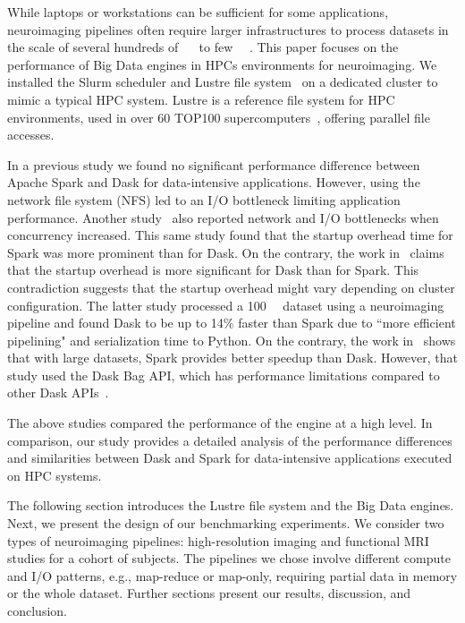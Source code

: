 \documentclass[AMA,STIX1COL]{WileyNJD-v2}
\newcommand{\HL}[1]{#1}
\begin{document}
While laptops or workstations can be sufficient for some applications, 
neuroimaging pipelines often require large\HL{r} infrastructures
\HL{to process datasets in the scale of several hundreds of {\SI{}{\gibi\byte}} to few {\SI{}{\tebi\byte}}.}
This paper focuses on the performance of Big Data engines in HPCs environments \HL{for neuroimaging}.
We installed the Slurm scheduler and Lustre file system~\cite{Braam2019TheLS} on a dedicated cluster to mimic a typical HPC system.
Lustre is a reference file system for HPC environments, used in over 60 TOP100 supercomputers~{\cite{OpenSFS-lustre}}, offering parallel file accesses.
			
In a previous study\cite{8943502} we found no significant performance difference between Apache Spark and Dask for data-intensive applications.
However, using the network file system (NFS) led to an I/O bottleneck limiting application performance.
Another study~\cite{8588652} also reported network and I/O bottlenecks when concurrency increased.
This same study found that the startup overhead time for Spark was more prominent than for Dask.
On the contrary, the work in~\cite{Mehta:17} claims that the startup overhead is more significant for Dask than for Spark.
This contradiction suggests that the startup overhead might vary depending on cluster configuration.
The latter study processed a \SI{100}{\giga\byte} dataset using a neuroimaging pipeline and found Dask to be up to 14\% faster than Spark due to ``more efficient pipelining" and serialization time to Python.
On the contrary, the work in~\cite{10.1145/3225058.3225128} shows that with large datasets, Spark provides better speedup than Dask.
However, that study used the Dask Bag API, which has performance limitations compared to other Dask APIs\HL{{~\cite{DaskBagDoc}}}.
			
The above studies compared the performance of the engine at a high level.
In comparison, our study provides a detailed analysis of the performance differences
and similarities between Dask and Spark for data-intensive applications executed on HPC systems.
			
The following section introduces the Lustre file system and the Big Data engines.
Next, we present the design of our benchmarking experiments.
We consider two types of neuroimaging pipelines: high-resolution imaging and functional MRI studies for a cohort of subjects.
The pipelines we chose involve different compute and I/O patterns, e.g., map-reduce or map-only, requiring partial data in memory or the whole dataset.
Further sections present our results, discussion, and conclusion.
			
\end{document}
